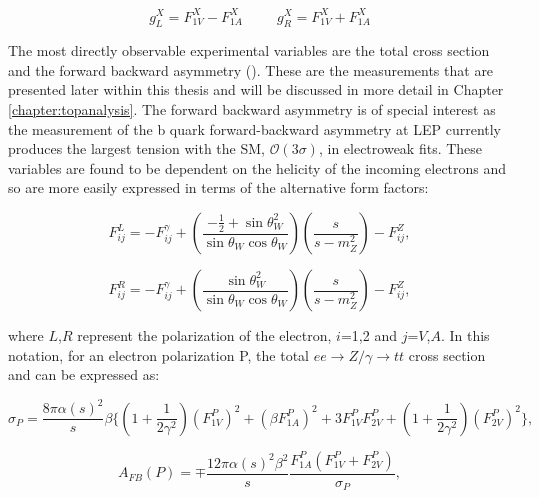 \begin{equation}
g_L^X = F_{1V}^{X} - F_{1A}^{X} ~~~~~~~~~~~ g_R^X = F_{1V}^{X} + F_{1A}^{X}
\end{equation}

The most directly observable experimental variables are the total cross section and the forward backward asymmetry (\afb). These are the measurements that are presented later within this thesis and will be discussed in more detail in Chapter \ref{chapter:topanalysis}. The forward backward asymmetry is of special interest as the measurement of the b quark forward-backward asymmetry at \ac{LEP}\cite{ABBIENDI200229} currently produces the largest tension with the \ac{SM}, $\mathcal{O}(3\sigma)$\cite{ALEPH:2005ab}, in electroweak fits. These variables are found to be dependent on the helicity of the incoming electrons \cite{Schmidt:1995mr} and so are more easily expressed in terms of the alternative form factors:

\begin{equation}
F_{ij}^{L} = -F_{ij}^{\gamma} +(\frac{-\frac{1}{2} +\sin\theta_W^2}{\sin\theta_W\cos\theta_W})(\frac{s}{s-m_Z^2}) -F_{ij}^{Z},
\end{equation}

\begin{equation}
F_{ij}^{R} = -F_{ij}^{\gamma} +(\frac{\sin\theta_W^2}{\sin\theta_W\cos\theta_W})(\frac{s}{s-m_Z^2}) -F_{ij}^{Z},
\end{equation}

where $L$,$R$ represent the polarization of the electron, $i$=1,2 and $j$=$V$,$A$. In this notation, for an electron polarization P, the total $ee\rightarrow Z/\gamma\rightarrow tt$ cross section and \afb can be expressed as:

\begin{equation}
\sigma_P = \frac{8\pi\alpha(s)^2}{s}\beta \{(1 + \frac{1}{2\gamma^2})(F_{1V}^P)^2 +(\beta F_{1A}^P)^2 +3F_{1V}^P F_{2V}^P + (1 + \frac{1}{2\gamma^2})(F_{2V}^P)^2\},
\end{equation}

\begin{equation}
\label{eq:afbFormFactors}
A_{FB}(P) = \mp \frac{12\pi\alpha(s)^2 \beta^2}{s}\frac{F_{1A}^P(F_{1V}^P +F_{2V}^P)}{\sigma_P},
\end{equation}

